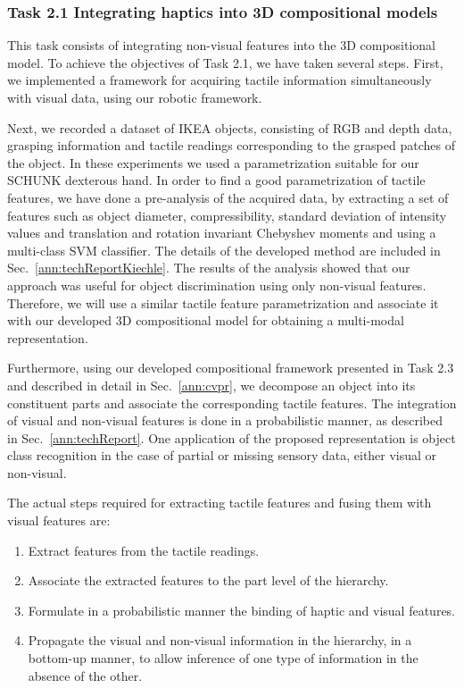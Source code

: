 \documentclass[a4paper,11pt,pdf]{pacmanreport}
\begin{document}
\subsubsection{Task 2.1 Integrating haptics into 3D compositional models}

This task consists of integrating non-visual features into the 3D 
compositional model. To achieve the objectives of Task 2.1, we have taken several steps. First, we implemented a framework for acquiring tactile information simultaneously with visual data, using our robotic framework. 

Next, we recorded a dataset of IKEA objects, consisting of RGB and depth data, grasping information and tactile readings corresponding to the grasped patches of the object. In these experiments we used a parametrization suitable for our SCHUNK dexterous hand. In order to find a good parametrization of tactile features, we have done a pre-analysis of the acquired data, by extracting a set of features such as object diameter, compressibility, standard deviation of intensity values 
and translation and rotation invariant Chebyshev moments and using a multi-class SVM classifier. The details of the developed method are included in Sec.~\ref{ann:techReportKiechle}. The results of the analysis showed that our approach was useful for object discrimination using only non-visual features. Therefore, we will use a similar tactile feature parametrization and associate it with our developed 3D compositional model for obtaining a multi-modal representation.

Furthermore, using our developed compositional framework presented in Task 2.3 and described in detail in Sec.~\ref{ann:cvpr}, we decompose an object into its constituent parts and associate the corresponding tactile features. The integration of visual and non-visual features is done in a probabilistic manner, as described in Sec.~\ref{ann:techReport}. One application of the proposed representation is object class recognition in the case of partial or missing sensory data, either visual or non-visual.

The actual steps required for extracting tactile features and fusing them with visual features are:

\begin{enumerate}

\item Extract features from the tactile readings.
\item Associate the extracted features to the part level of the hierarchy.
\item Formulate in a probabilistic manner the binding of haptic and visual features.
\item Propagate the visual and non-visual information in the
  hierarchy, in a bottom-up manner, to allow inference of one type of
  information in the absence of the other.
\end{enumerate}
\end{document}
